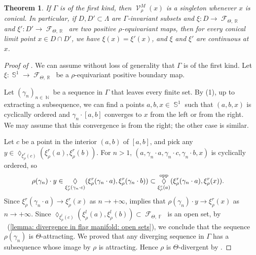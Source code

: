 \documentclass{amsart}
\theoremstyle{plain}
\newtheorem{theorem}[proposition]{Theorem}
\theoremstyle{definition}
\DeclareMathOperator{\Diam}{\lozenge}
\newcommand{\bdext}{{\Vc^M_\rho}}
\DeclareMathOperator{\Fc}{\mathcal{F}}
\DeclareMathOperator{\Vc}{\mathcal{V}}
\DeclareMathOperator{\Fb}{{\mathbb{F}}}
\DeclareMathOperator{\Nb}{{\mathbb{N}}}
\DeclareMathOperator{\Rb}{{\mathbb{R}}}
\DeclareMathOperator{\Sb}{\mathbb{S}}
\newcommand{\opp}{\textnormal{opp}}
\newcommand{\1}{\mathbf{1}}
\begin{document}
\begin{theorem} \label{thm: continuity at conical limit points}
    If $\Gamma$ is of the first kind, then $\bdext(x)$ is a singleton whenever $x$ is conical. In particular, if $D,D'\subset\Lambda$ are $\Gamma$-invariant subsets and $\xi \colon D \to \Fc_{\Theta,\Rb}$ and $\xi' \colon D' \to \Fc_{\Theta,\Rb}$ are two positive $\rho$-equivariant maps, then for every conical limit point $x \in D \cap D'$, we have $\xi(x)= \xi'(x)$, and $\xi$ and $\xi'$ are continuous at $x$. 
\end{theorem}
\begin{proof}[Proof of ]
    We can assume without loss of generality that $\Gamma$ is of the first kind. Let $\xi: \Sb^1 \to \Fc_{\Theta,\Rb}$ be a $\rho$-equivariant positive boundary map.
    
    Let $(\gamma_n)_{n\in \Nb}$ be a sequence in $\Gamma$ that leaves every finite set.
    By (1), up to extracting a subsequence, we can find a points $a,b,x\in \Sb^1$ such that $(a,b,x)$ is cyclically ordered and $\gamma_n\cdot [a,b]$ converges to $x$ from the left or from the right. We may assume that this convergence is from the right; the other case is similar. 
    
    Let $c$ be a point in the interior $(a,b)$ of $[a,b]$, and pick any $y\in\Diam_{\xi_\rho^r(c)}(\xi_\rho^r(a),\xi_\rho^r(b))$. For $n>1$, $(a,\gamma_n\cdot a,\gamma_n\cdot c, \gamma_n\cdot b,x)$ is cyclically ordered, so
    \[\rho(\gamma_n)\cdot y\in\Diam_{\xi_\rho^r(\gamma_n\cdot c)}(\xi_\rho^r(\gamma_n\cdot a),\xi_\rho^r(\gamma_n\cdot b))\subset\Diam_{\xi_\rho^r(a)}^\opp(\xi_\rho^r(\gamma_n\cdot a),\xi_\rho^r(x)).\]
    Since $\xi^r_\rho(\gamma_n\cdot a)\to \xi^r_\rho(x)$ as $n\to+\infty$,  implies that $\rho(\gamma_n)\cdot y\to \xi^r_\rho(x)$ as $n\to+\infty$. Since $\Diam_{\xi^l_\rho(c)}(\xi^l_\rho(a),\xi^l_\rho(b))\subset\Fc_{\Theta,\Fb}$ is an open set,
    by ~(\ref{lemma: divergence in flag manifold: open sets}), we conclude that the sequence $\rho(\gamma_n)$ is $\Theta$-attracting. We proved that any diverging sequence in $\Gamma$ has a subsequence whose image by $\rho$ is attracting. Hence $\rho$ is $\Theta$-divergent by .
\end{proof}
\end{document}
